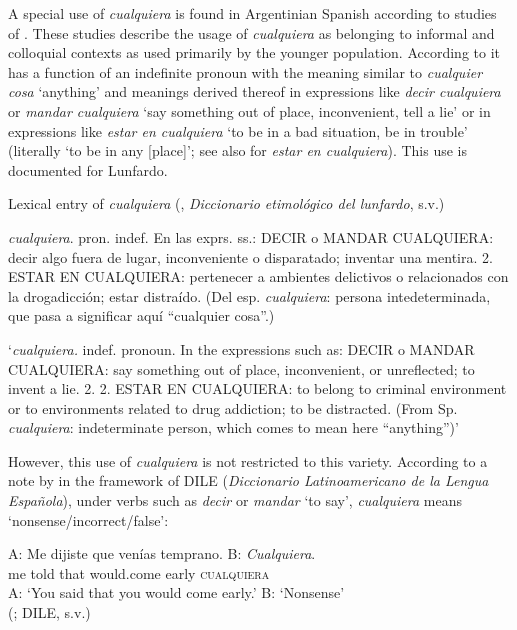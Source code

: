A special use of \textit{cualquiera} is found in Argentinian Spanish according to studies of \citet{Conde2011, Rizzosalierno2013}. These studies describe the usage of \textit{cualquiera} as belonging to informal and colloquial contexts as used primarily by the younger population. 
According to \citet{Conde2011} it has a function of an indefinite pronoun with the meaning similar to \textit{cualquier cosa} ‘anything’ and meanings derived thereof in expressions like \textit{decir cualquiera} or \textit{mandar cualquiera} ‘say something out of place, inconvenient, tell a lie’ or in expressions like \textit{estar en cualquiera} ‘to be in a bad situation, be in trouble’ (literally ‘to be in any [place]’; see also \citealt{Company2009} for \textit{estar en cualquiera}). This use is documented for Lunfardo.

\ea \label{ex:key:55} %
  Lexical entry of \textit{cualquiera} (\citealt{Conde2011}, \textit{Diccionario etimológico del lunfardo}, s.v.)

  \textit{cualquiera}. pron. indef. En las exprs. ss.: DECIR o MANDAR CUALQUIERA: decir algo fuera de lugar, inconveniente o disparatado; inventar una mentira. {\textbar} 2. ESTAR EN CUALQUIERA: pertenecer a ambientes delictivos o relacionados con la drogadicción; estar distraído. (Del esp. \textit{cualquiera}: persona intedeterminada, que pasa a significar aquí “cualquier cosa”.)

‘\textit{cualquiera.} indef. pronoun. In the expressions such as: DECIR o MANDAR CUALQUIERA: say something out of place, inconvenient, or unreflected; to invent a lie. {\textbar} 2. 2. ESTAR EN CUALQUIERA: to belong to criminal environment or to environments related to drug addiction; to be distracted. (From Sp. \textit{cualquiera}: indeterminate person, which comes to mean here “anything”)’
\z

However, this use of \textit{cualquiera} is not restricted to this variety. According to a note by \citet{ditullio2015cualquiera} in the framework of DILE (\textit{Diccionario Latinoamericano de la Lengua Española}), under verbs such as \textit{decir} or \textit{mandar} ‘to say’, \textit{cualquiera} means ‘nonsense/incorrect/false’:

\ea \label{ex:key:56} %
  \gll A: Me dijiste que venías temprano. B: \textit{Cualquiera}.\\
    {} me told that would.come early {} \textsc{cualquiera}\\
  \glt A: ‘You said that you would come early.’ B: ‘Nonsense’\\
    (\citealt{ditullio2015cualquiera}; DILE, s.v.)
\z

